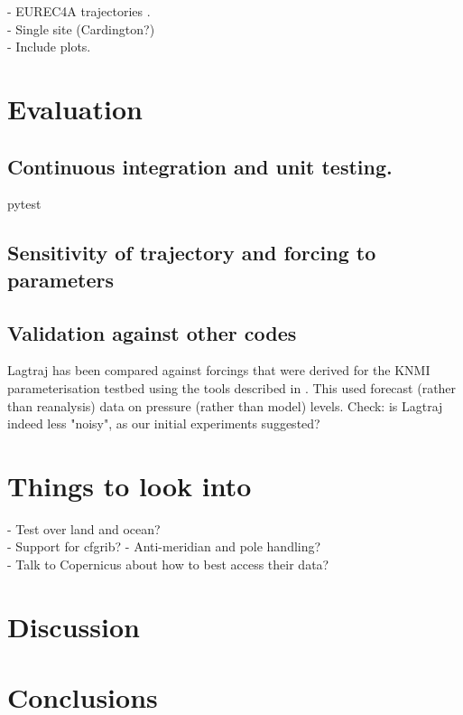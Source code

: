 \documentclass[a4paper,11pt]{article}
\begin{document}
- EUREC4A trajectories \cite{bony2017}. \\
- Single site (Cardington?) \\
- Include plots.

\section{Evaluation}\label{sec:evaluation}

\subsection{Continuous integration and unit testing.}

pytest \citep{okken2017}

\subsection{Sensitivity of trajectory and forcing to parameters}


\subsection{Validation against other codes}

Lagtraj has been compared against forcings that were derived for the
KNMI parameterisation testbed using the tools described in . This used
forecast (rather than reanalysis) data on pressure (rather than model)
levels. Check: is Lagtraj indeed less "noisy", as our initial
experiments suggested?

\section*{Things to look into}

- Test over land and ocean? \\
- Support for cfgrib?
- Anti-meridian and pole handling? \\
- Talk to Copernicus about how to best access their data? \\

\section{Discussion}

\section{Conclusions}



\end{document}
